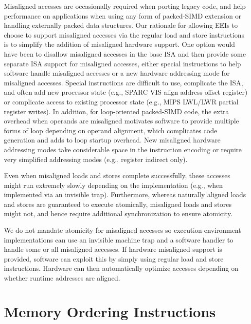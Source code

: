 \begin{commentary}
Misaligned accesses are occasionally required when porting legacy
code, and help performance on applications when using any form of
packed-SIMD extension or handling externally packed data structures.
Our rationale for allowing EEIs to choose to support misaligned
accesses via the regular load and store instructions is to simplify
the addition of misaligned hardware support.  One option would have
been to disallow misaligned accesses in the base ISA and then provide
some separate ISA support for misaligned accesses, either special
instructions to help software handle misaligned accesses or a new
hardware addressing mode for misaligned accesses.  Special
instructions are difficult to use, complicate the ISA, and often add
new processor state (e.g., SPARC VIS align address offset register) or
complicate access to existing processor state (e.g., MIPS LWL/LWR
partial register writes).  In addition, for loop-oriented packed-SIMD
code, the extra overhead when operands are misaligned motivates
software to provide multiple forms of loop depending on operand
alignment, which complicates code generation and adds to loop startup
overhead.  New misaligned hardware addressing modes take considerable
space in the instruction encoding or require very simplified
addressing modes (e.g., register indirect only).
\end{commentary}

Even when misaligned loads and stores complete successfully, these
accesses might run extremely slowly depending on the implementation
(e.g., when implemented via an invisible trap).  Furthermore, whereas
naturally aligned loads and stores are guaranteed to execute
atomically, misaligned loads and stores might not, and hence
require additional synchronization to ensure atomicity.

\begin{commentary}
We do not mandate atomicity for misaligned accesses so execution
environment implementations can use an invisible machine trap and
a software handler to handle some or all misaligned accesses.  If
hardware misaligned support is provided, software can exploit this by
simply using regular load and store instructions.  Hardware can then
automatically optimize accesses depending on whether runtime addresses
are aligned.
\end{commentary}

\pagebreak

\section{Memory Ordering Instructions}
\label{sec:fence}

